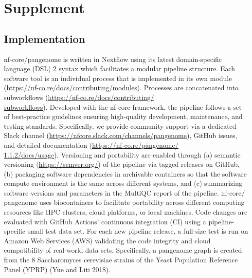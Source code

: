\documentclass{bioinfo}
\theoremstyle{definition}
\newcommand{\beginsupplement}{%
	\setcounter{table}{0}
	\renewcommand{\thetable}{S\arabic{table}}%
	\setcounter{figure}{0}
	\renewcommand{\thefigure}{S\arabic{figure}}%
}
\begin{document}
	
	
	\clearpage
	\setcounter{page}{1}
	
	\beginsupplement
	
	\section{Supplement}
	
	\subsection{Implementation}
	\label{implementation}
	
	nf-core/pangenome is written in Nextflow using its latest domain-specific language (DSL) 2 syntax which facilitates a modular pipeline structure. 
	Each software tool is an individual process that is implemented in its own module (\href{https://nf-co.re/docs/contributing/modules}{https://nf-co.re/docs/contributing/modules}). 
	Processes are concatenated into subworkflows (\href{https://nf-co.re/docs/contributing/subworkflows}{https://nf-co.re/docs/contributing/\\subworkflows}). 
	Developed with the nf-core framework, the pipeline follows a set of best-practice guidelines ensuring high-quality development, maintenance, and testing standards. Specifically, we provide community support via a dedicated Slack channel (\href{https://nfcore.slack.com/channels/pangenome}{https://nfcore.slack.com/channels/pangenome}), GitHub issues, and detailed documentation (\href{https://nf-co.re/pangenome/1.1.2/docs/usage}{https://nf-co.re/pangenome/\\1.1.2/docs/usage}).
	Versioning and portability are enabled through (a) semantic versioning (\href{https://semver.org/}{https://semver.org/}) of the pipeline via tagged releases on GitHub, (b) packaging software dependencies in archivable containers so that the software compute environment is the same across different systems, and (c) summarizing software versions and parameters in the MultiQC report of the pipeline. 
	nf-core/ pangenome uses biocontainers to facilitate portability across different computing resources like HPC clusters, cloud platforms, or local machines. 
	Code changes are evaluated with GitHub Actions’ continuous integration (CI) using a pipeline-specific small test data set. 
	For each new pipeline release, a full-size test is run on Amazon Web Services (AWS) validating the code integrity and cloud compatibility of real-world data sets.
	Specifically, a pangenome graph is created from the 8 Saccharomyces cerevisiae strains of the Yeast Population Reference Panel (YPRP) (Yue and Liti 2018). 
\end{document}
